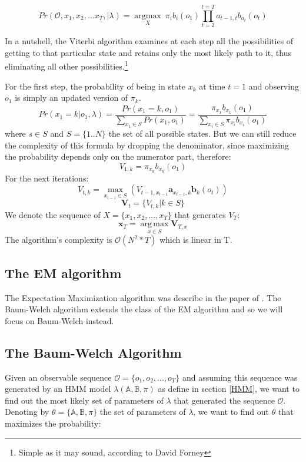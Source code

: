 \documentclass[a4paper,12pt]{article}
\theoremstyle{definition}
\begin{document}
\begin{equation}
Pr\left(\mathcal{O}, x_1,x_2,...x_T,| \lambda \right)= \underset{X}{\operatorname{argmax}} \: \pi_i b_i(o_1) \prod_{t=2}^{t=T} a_{t-1,t}b_{a_t}(o_t)
\end{equation}

In a nutshell, the Viterbi algorithm examines at each step all the possibilities of getting to that particular state and retains only the most likely path to it, thus eliminating all other possibilities.\footnote{Simple as it may sound, according to David Forney }

For the first step, the probability of being in state $x_k$ at time $t=1$ and observing $o_1$ is simply an updated version of $\pi_k$.
$$Pr(x_1=k|o_1,\lambda) = \frac{Pr(x_1=k,o_1)}{\sum_{x_1\in S}Pr(x_1,o_1)}= \frac{\pi_{x_1}b_{x_1}(o_1)}{\sum_{x_i \in S} \pi_{x_i}b_{x_i}(o_1)}$$
where $s \in S$ and $S = \{1..N\}$ the set of all possible states. 
But we can still reduce the complexity of this formula by dropping the denominator, since maximizing the probability depends only on the numerator part, therefore:
\begin{equation}
V_{1,k}=\pi_{x_k}b_{x_k}(o_1)
\end{equation}
For the next iterations:
\begin{equation}
V_{t,k} = \underset{x_{t-1}\in S}{\operatorname{max}}\left( V_{t-1,x_{t-1}} \mathbf{a}_{x_{t-1},k} \mathbf{b}_{k}(o_t) \right)
\end{equation}
$$ \mathbf{V}_t = \{V_{t,k}|k \in  S\} $$
We denote the sequence of $X = \{ x_1,x_2,...,x_T \}$ that generates $V_T$:
$$\mathbf{x}_T = \underset{x\in S}{\operatorname{arg\, max}}\mathbf{V}_{T,x}$$
The algorithm's complexity is $\mathcal{O}(N^2*T)$ which is linear in T. 
\subsection{The EM algorithm}\label{sec:EM}
The Expectation Maximization algorithm was describe in the paper of \cite{Dempster77}. 
The Baum-Welch algorithm extends the class of the EM algorithm and so we will focus on Baum-Welch instead. 

\subsection{The Baum-Welch Algorithm}\label{sec:BW}
Given an observable sequence $\mathcal{O} = \{o_1,o_2,...,o_T \}$ and assuming this sequence was generated by an HMM model $\lambda(\mathbb{A,B},\pi)$ as define in section \ref{HMM}, we want to find out the most likely set of parameters of $\lambda$ that generated the sequence $\mathcal{O}$. Denoting by $\theta = \{\mathbb{A,B},\pi\}$ the set of parameters of $\lambda$, we want to find out $\theta$ that maximizes the probability: 
\end{document}
